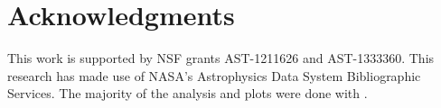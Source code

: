 \documentclass[useAMS,usenatbib]{mn2e}
\begin{document}


\section*{Acknowledgments}

This work is supported by NSF grants AST-1211626 and AST-1333360.
This research has made use of NASA's Astrophysics Data System
Bibliographic Services.  The majority of the analysis and plots were
done with \yt \citep{yt_full_paper}.


\bsp
\label{lastpage}
\end{document}

